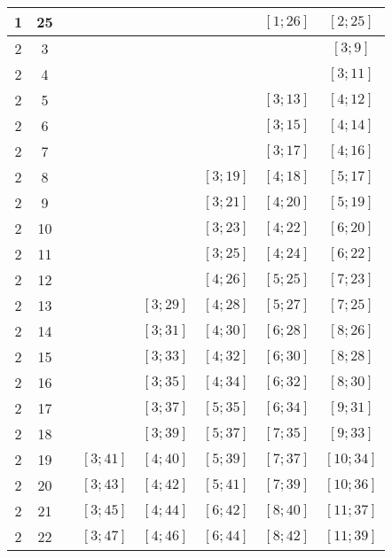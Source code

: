 \documentclass[a4paper,12pt]{article}
\begin{document}
\begin{center}
{\begin{longtable}[H]{|c|c|c|c|c|c|c|c|}
1 &  25 &   &   &   &   &  $\left[ 1; 26\right]$ &  $\left[ 2; 25\right]$ \tabularnewline \hline
2 &  3 &   &   &   &   &   &  $\left[ 3; 9\right]$ \tabularnewline \hline
2 &  4 &   &   &   &   &   &  $\left[ 3; 11\right]$ \tabularnewline \hline
2 &  5 &   &   &   &   &  $\left[ 3; 13\right]$ &  $\left[ 4; 12\right]$ \tabularnewline \hline
2 &  6 &   &   &   &   &  $\left[ 3; 15\right]$ &  $\left[ 4; 14\right]$ \tabularnewline \hline
2 &  7 &   &   &   &   &  $\left[ 3; 17\right]$ &  $\left[ 4; 16\right]$ \tabularnewline \hline
2 &  8 &   &   &   &  $\left[ 3; 19\right]$ &  $\left[ 4; 18\right]$ &  $\left[ 5; 17\right]$ \tabularnewline \hline
2 &  9 &   &   &   &  $\left[ 3; 21\right]$ &  $\left[ 4; 20\right]$ &  $\left[ 5; 19\right]$ \tabularnewline \hline
2 &  10 &   &   &   &  $\left[ 3; 23\right]$ &  $\left[ 4; 22\right]$ &  $\left[ 6; 20\right]$ \tabularnewline \hline
2 &  11 &   &   &   &  $\left[ 3; 25\right]$ &  $\left[ 4; 24\right]$ &  $\left[ 6; 22\right]$ \tabularnewline \hline
2 &  12 &   &   &   &  $\left[ 4; 26\right]$ &  $\left[ 5; 25\right]$ &  $\left[ 7; 23\right]$ \tabularnewline \hline
2 &  13 &   &   &  $\left[ 3; 29\right]$ &  $\left[ 4; 28\right]$ &  $\left[ 5; 27\right]$ &  $\left[ 7; 25\right]$ \tabularnewline \hline
2 &  14 &   &   &  $\left[ 3; 31\right]$ &  $\left[ 4; 30\right]$ &  $\left[ 6; 28\right]$ &  $\left[ 8; 26\right]$ \tabularnewline \hline
2 &  15 &   &   &  $\left[ 3; 33\right]$ &  $\left[ 4; 32\right]$ &  $\left[ 6; 30\right]$ &  $\left[ 8; 28\right]$ \tabularnewline \hline
2 &  16 &   &   &  $\left[ 3; 35\right]$ &  $\left[ 4; 34\right]$ &  $\left[ 6; 32\right]$ &  $\left[ 8; 30\right]$ \tabularnewline \hline
2 &  17 &   &   &  $\left[ 3; 37\right]$ &  $\left[ 5; 35\right]$ &  $\left[ 6; 34\right]$ &  $\left[ 9; 31\right]$ \tabularnewline \hline
2 &  18 &   &   &  $\left[ 3; 39\right]$ &  $\left[ 5; 37\right]$ &  $\left[ 7; 35\right]$ &  $\left[ 9; 33\right]$ \tabularnewline \hline
2 &  19 &   &  $\left[ 3; 41\right]$ &  $\left[ 4; 40\right]$ &  $\left[ 5; 39\right]$ &  $\left[ 7; 37\right]$ &  $\left[ 10; 34\right]$ \tabularnewline \hline
2 &  20 &   &  $\left[ 3; 43\right]$ &  $\left[ 4; 42\right]$ &  $\left[ 5; 41\right]$ &  $\left[ 7; 39\right]$ &  $\left[ 10; 36\right]$ \tabularnewline \hline
2 &  21 &   &  $\left[ 3; 45\right]$ &  $\left[ 4; 44\right]$ &  $\left[ 6; 42\right]$ &  $\left[ 8; 40\right]$ &  $\left[ 11; 37\right]$ \tabularnewline \hline
2 &  22 &   &  $\left[ 3; 47\right]$ &  $\left[ 4; 46\right]$ &  $\left[ 6; 44\right]$ &  $\left[ 8; 42\right]$ &  $\left[ 11; 39\right]$ \tabularnewline \hline

\end{longtable}}
\end{center}
\end{document}
